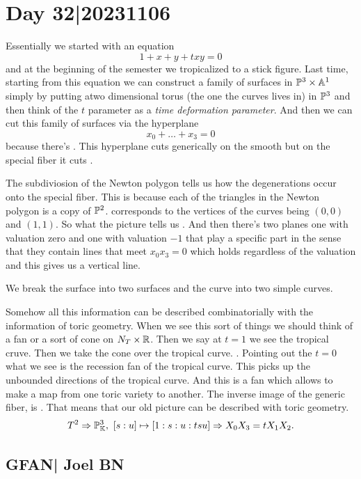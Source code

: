 \documentclass[12pt]{memoir}
\theoremstyle{definition}
\begin{document}
\section{Day 32|20231106}

Essentially we started with an equation 
$$1+x+y+txy=0$$
and at the beginning of the semester we tropicalized to a stick figure. Last time, starting from this equation we can construct a family of surfaces in $\mathbb{P}^3\times\mathbb{A}^1$ simply by putting atwo dimensional torus (the one the curves lives in) in $\mathbb{P}^3$ and then think of the $t$ parameter as a \emph{time deformation parameter}.  And then we can cut this family of surfaces via the hyperplane 
$$x_0+\dots+x_3=0$$
because there's . This hyperplane cuts generically on the smooth but on the special fiber it cuts .\par 
The subdiviosion of the Newton polygon tells us how the degenerations occur onto the special fiber. This is because each of the triangles in the Newton polygon is a copy of $\mathbb{P}^2$.  corresponds to the vertices of the curves being $(0,0)$ and $(1,1)$. So what the picture tells us . And then there's two planes one with valuation zero and one with valuation $-1$ that play a specific part in the sense that they contain lines that meet $x_0x_3=0$ which holds regardless of the valuation and this gives us a vertical line.\par 
We break the surface into two surfaces and the curve into two simple curves.\par 
Somehow all this information can be described combinatorially with the information of toric geometry. When we see this sort of things we should think of a fan or a sort of cone on $N_T\times\mathbb{R}$. Then we say at $t=1$ we see the tropical cruve. Then we take the cone over the tropical curve. . Pointing out the $t=0$ what we see is the recession fan of the tropical curve. This picks up the unbounded directions of the tropical curve. And this is a fan which allows to make a map from one toric variety to another. The inverse image of the generic fiber, is . That means that our old picture can be described with toric geometry. 
$$T^2\Rightarrow\mathbb{P}^3_{\mathbb{K}},\ [s:u]\mapsto[1:s:u:tsu] \Rightarrow X_0X_3=tX_1X_2.$$

\subsection{GFAN| Joel BN}
\end{document}
